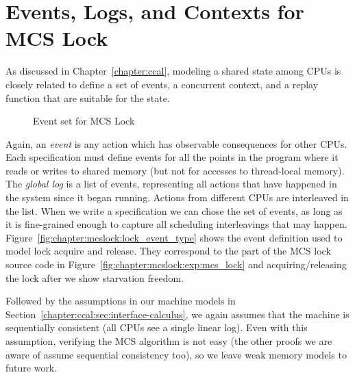\section{Events, Logs, and  Contexts for MCS Lock}
\label{chapter:mcslock:sec:eventlogandoracle}

As discussed in Chapter~\ref{chapter:ccal}, 
modeling a shared state among CPUs is 
closely related to define a set of events, a concurrent context, and a replay function that are suitable for
the state.


\begin{figure}
\begin{minipage}{\linewidth}

\end{minipage}
\caption{Event set for MCS Lock}
\label{fig:chapter:mcslokc:lock_event_type}
\end{figure}

Again, an \emph{event} is any action which has observable consequences for
other CPUs. Each specification must define events for all the points
in the program where it reads or writes to shared memory (but not for
accesses to thread-local memory). The \emph{global log} is a list of
events, representing all actions that have happened in the system
since it began running. Actions from different CPUs are interleaved in
the list.
When we write a specification we can chose the set of events, as long
as it is fine-grained enough to capture all scheduling interleavings
that may happen.
Figure~\ref{fig:chapter:mcslock:lock_event_type} shows the event definition used to
model lock acquire and release. They correspond to the part of the MCS lock source code in Figure~\ref{fig:chapter:mcslock:exp:mcs_lock}
and acquiring/releasing the lock after we show starvation freedom. 

Followed by the assumptions in our machine models in Section~\ref{chapter:ccal:sec:interface-calculus},  we again assumes that the
machine is sequentially consistent (all CPUs see a single linear log). Even with this assumption,
verifying the MCS algorithm is not easy (the other proofs we are aware
of assume sequential consistency too), so we leave weak memory models
to future work.

